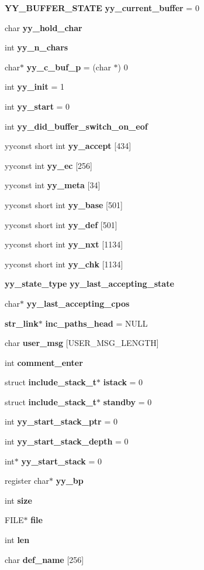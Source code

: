 \begin{CompactItemize}
\item 
{\bf YY\_\-BUFFER\_\-STATE} {\bf yy\_\-current\_\-buffer} = 0
\item 
char {\bf yy\_\-hold\_\-char}
\item 
int {\bf yy\_\-n\_\-chars}
\item 
char$\ast$ {\bf yy\_\-c\_\-buf\_\-p} = (char $\ast$) 0
\item 
int {\bf yy\_\-init} = 1
\item 
int {\bf yy\_\-start} = 0
\item 
int {\bf yy\_\-did\_\-buffer\_\-switch\_\-on\_\-eof}
\item 
yyconst short int {\bf yy\_\-accept} [434]
\item 
yyconst int {\bf yy\_\-ec} [256]
\item 
yyconst int {\bf yy\_\-meta} [34]
\item 
yyconst short int {\bf yy\_\-base} [501]
\item 
yyconst short int {\bf yy\_\-def} [501]
\item 
yyconst short int {\bf yy\_\-nxt} [1134]
\item 
yyconst short int {\bf yy\_\-chk} [1134]
\item 
{\bf yy\_\-state\_\-type} {\bf yy\_\-last\_\-accepting\_\-state}
\item 
char$\ast$ {\bf yy\_\-last\_\-accepting\_\-cpos}
\item 
{\bf str\_\-link}$\ast$ {\bf inc\_\-paths\_\-head} = NULL
\item 
char {\bf user\_\-msg} [USER\_\-MSG\_\-LENGTH]
\item 
int {\bf comment\_\-enter}
\item 
struct {\bf include\_\-stack\_\-t}$\ast$ {\bf istack} = 0
\item 
struct {\bf include\_\-stack\_\-t}$\ast$ {\bf standby} = 0
\item 
int {\bf yy\_\-start\_\-stack\_\-ptr} = 0
\item 
int {\bf yy\_\-start\_\-stack\_\-depth} = 0
\item 
int$\ast$ {\bf yy\_\-start\_\-stack} = 0
\item 
register char$\ast$ {\bf yy\_\-bp}
\item 
int {\bf size}
\item 
FILE$\ast$ {\bf file}
\item 
int {\bf len}
\item 
char {\bf def\_\-name} [256]
\end{CompactItemize}


